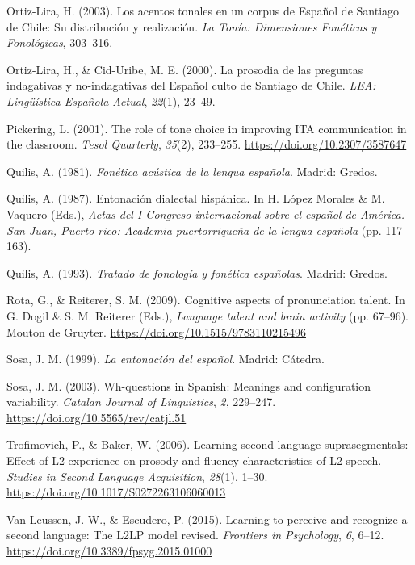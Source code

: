 \documentclass[]{article}
\newlength{\cslhangindent}
\newenvironment{CSLReferences}[2] %
 {%
  \setlength{\parindent}{0pt}
  \ifodd #1 \everypar{\setlength{\hangindent}{\cslhangindent}}\ignorespaces\fi
  \ifnum #2 > 0
  \setlength{\parskip}{#2\baselineskip}
  \fi
 }%
 {}
\begin{document}
\begin{CSLReferences}{1}{0}
\leavevmode{}%
Ortiz-Lira, H. (2003). Los acentos tonales en un corpus de {E}spañol de {Santiago de Chile}: Su distribución y realización. \emph{La Tonía: Dimensiones Fonéticas y Fonológicas}, 303--316.

\leavevmode{}%
Ortiz-Lira, H., \& Cid-Uribe, M. E. (2000). La prosodia de las preguntas indagativas y no-indagativas del {E}spañol culto de {S}antiago de {C}hile. \emph{LEA: Lingüística {E}spañola {A}ctual}, \emph{22}(1), 23--49.

\leavevmode{}%
Pickering, L. (2001). The role of tone choice in improving {ITA} communication in the classroom. \emph{Tesol Quarterly}, \emph{35}(2), 233--255. \url{https://doi.org/10.2307/3587647}

\leavevmode{}%
Quilis, A. (1981). \emph{Fon{é}tica ac{ú}stica de la lengua espa{ñ}ola}. Madrid: Gredos.

\leavevmode{}%
Quilis, A. (1987). Entonación dialectal hispánica. In H. López Morales \& M. Vaquero (Eds.), \emph{{A}ctas del {I} {C}ongreso internacional sobre el español de {A}mérica. {S}an {J}uan, {P}uerto rico: {A}cademia puertorriqueña de la lengua española} (pp. 117--163).

\leavevmode{}%
Quilis, A. (1993). \emph{Tratado de fonología y fonética españolas}. Madrid: Gredos.

\leavevmode{}%
Rota, G., \& Reiterer, S. M. (2009). Cognitive aspects of pronunciation talent. In G. Dogil \& S. M. Reiterer (Eds.), \emph{Language talent and brain activity} (pp. 67--96). Mouton de Gruyter. \url{https://doi.org/10.1515/9783110215496}

\leavevmode{}%
Sosa, J. M. (1999). \emph{La entonación del español}. Madrid: Cátedra.

\leavevmode{}%
Sosa, J. M. (2003). Wh-questions in {S}panish: Meanings and configuration variability. \emph{Catalan Journal of Linguistics}, \emph{2}, 229--247. \url{https://doi.org/10.5565/rev/catjl.51}

\leavevmode{}%
Trofimovich, P., \& Baker, W. (2006). Learning second language suprasegmentals: Effect of {L}2 experience on prosody and fluency characteristics of {L}2 speech. \emph{Studies in Second Language Acquisition}, \emph{28}(1), 1--30. \url{https://doi.org/10.1017/S0272263106060013}

\leavevmode{}%
Van Leussen, J.-W., \& Escudero, P. (2015). Learning to perceive and recognize a second language: {T}he {L2LP} model revised. \emph{Frontiers in Psychology}, \emph{6}, 6--12. \url{https://doi.org/10.3389/fpsyg.2015.01000}

\end{CSLReferences}
\end{document}

